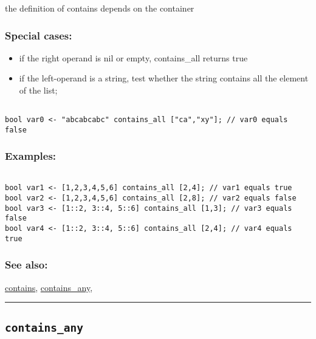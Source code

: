 \documentclass[]{book}
\providecommand{\tightlist}{%
  \setlength{\itemsep}{0pt}\setlength{\parskip}{0pt}}
\theoremstyle{definition}
\theoremstyle{definition}
\theoremstyle{definition}
\theoremstyle{remark}
\begin{document}
the definition of contains depends on the container

\subsubsection{Special cases:}\label{special-cases-33}

\begin{itemize}
\tightlist
\item
  if the right operand is nil or empty, contains\_all returns true\\
\item
  if the left-operand is a string, test whether the string contains all
  the element of the list;
\end{itemize}

\begin{verbatim}
 
bool var0 <- "abcabcabc" contains_all ["ca","xy"]; // var0 equals false
\end{verbatim}

\subsubsection{Examples:}\label{examples-77}

\begin{verbatim}
 
bool var1 <- [1,2,3,4,5,6] contains_all [2,4]; // var1 equals true  
bool var2 <- [1,2,3,4,5,6] contains_all [2,8]; // var2 equals false 
bool var3 <- [1::2, 3::4, 5::6] contains_all [1,3]; // var3 equals false  
bool var4 <- [1::2, 3::4, 5::6] contains_all [2,4]; // var4 equals true
\end{verbatim}

\subsubsection{See also:}\label{see-also-63}

\href{OperatorsBC\#contains}{contains},
\href{OperatorsBC\#contains_any}{contains\_any},

\begin{center}\rule{0.5\linewidth}{\linethickness}\end{center}

\subsection{\texorpdfstring{\texttt{contains\_any}}{contains\_any}}\label{contains_any}
\end{document}
